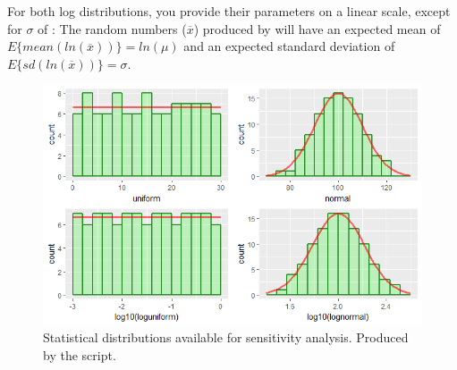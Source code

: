 For both log distributions, you provide their parameters on a linear scale, except for $\sigma$ of : The random numbers ($\overline{x}$) produced by  will have an expected mean of $E\{mean(ln(\overline{x}))\}=ln(\mu)$ and an expected standard deviation of $E\{sd(ln(\overline{x}))\}=\sigma$.

\begin{figure} [t]
\centering
\includegraphics[width=.8\textwidth]{graphics/sensitivity5}
\caption{Statistical distributions available for sensitivity analysis. Produced by the   script.}
\label{fig:sensitivity5}
\end{figure}
